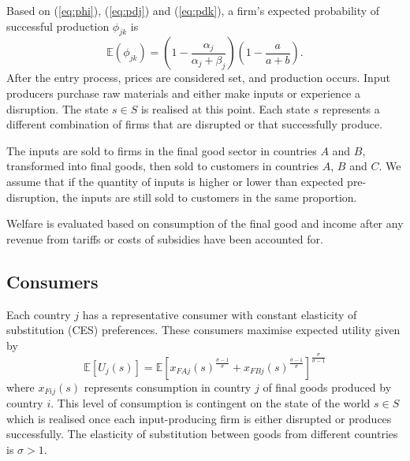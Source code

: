 \documentclass{article}
\begin{document}
Based on (\ref{eq:phi}), (\ref{eq:pdj}) and (\ref{eq:pdk}), a firm's expected probability of successful production $\phi_{jk}$ is
\begin{equation}\label{eq:ephi}
    \mathbb{E} (\phi_{jk}) = \left(1 - \frac{\alpha_j}{\alpha_j + \beta_j}\right) \left(1 - \frac{a}{a + b}\right) .
\end{equation}
After the entry process, prices are considered set, and production occurs. Input producers purchase raw materials and either make inputs or experience a disruption. The state $s \in S$ is realised at this point. Each state $s$ represents a different combination of firms that are disrupted or that successfully produce.

The inputs are sold to firms in the final good sector in countries $A$ and $B$, transformed into final goods, then sold to customers in countries $A$, $B$ and $C$. We assume that if the quantity of inputs is higher or lower than expected pre-disruption, the inputs are still sold to customers in the same proportion. 

Welfare is evaluated based on consumption of the final good and income after any revenue from tariffs or costs of subsidies have been accounted for.

\subsection{Consumers}
 
Each country $j$ has a representative consumer with constant elasticity of substitution (CES) preferences. These consumers maximise expected utility given by
\begin{equation}
    \mathbb{E} \left[ U_j(s) \right] = \mathbb{E} \left[ x_{FAj}(s)^{\frac{\sigma - 1}{\sigma}} + x_{FBj}(s)^{\frac{\sigma - 1}{\sigma}} \right]^{\frac{\sigma}{\sigma - 1}}
\end{equation}
where $x_{Fij}(s)$ represents consumption in country $j$ of final goods produced by country $i$. This level of consumption is contingent on the state of the world $s \in S$ which is realised once each input-producing firm is either disrupted or produces successfully. The elasticity of substitution between goods from different countries is $\sigma > 1$. 
\end{document}
